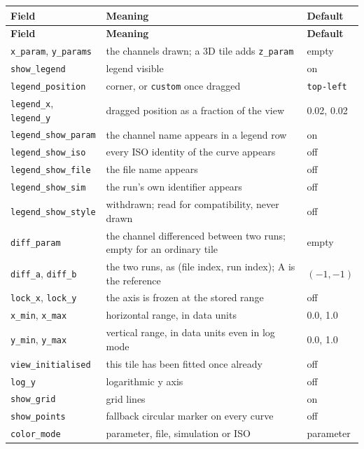 \documentclass[11pt,a4paper,oneside]{report}
\newcommand{\code}[1]{\texttt{#1}}
\begin{document}
\begin{center}
\small
\begin{longtable}{@{}p{}p{}p{}@{}}
\toprule
\textbf{Field} & \textbf{Meaning} & \textbf{Default} \\
\midrule
\endfirsthead
\toprule
\textbf{Field} & \textbf{Meaning} & \textbf{Default} \\
\midrule
\endhead
\code{x\_param}, \code{y\_params} & the channels drawn; a 3D tile adds \code{z\_param} & empty \\
\code{show\_legend} & legend visible & on \\
\code{legend\_position} & corner, or \code{custom} once dragged & \code{top-left} \\
\code{legend\_x}, \code{legend\_y} & dragged position as a fraction of the view & 0.02, 0.02 \\
\code{legend\_show\_param} & the channel name appears in a legend row & on \\
\code{legend\_show\_iso} & every ISO identity of the curve appears & off \\
\code{legend\_show\_file} & the file name appears & off \\
\code{legend\_show\_sim} & the run's own identifier appears & off \\
\code{legend\_show\_style} & withdrawn; read for compatibility, never drawn & off \\
\code{diff\_param} & the channel differenced between two runs; empty for an ordinary tile & empty \\
\code{diff\_a}, \code{diff\_b} & the two runs, as (file index, run index); A is the reference & $(-1,-1)$ \\
\code{lock\_x}, \code{lock\_y} & the axis is frozen at the stored range & off \\
\code{x\_min}, \code{x\_max} & horizontal range, in data units & 0.0, 1.0 \\
\code{y\_min}, \code{y\_max} & vertical range, in data units even in log mode & 0.0, 1.0 \\
\code{view\_initialised} & this tile has been fitted once already & off \\
\code{log\_y} & logarithmic y axis & off \\
\code{show\_grid} & grid lines & on \\
\code{show\_points} & fallback circular marker on every curve & off \\
\code{color\_mode} & parameter, file, simulation or ISO & parameter \\

\end{longtable}
\end{center}
\end{document}

